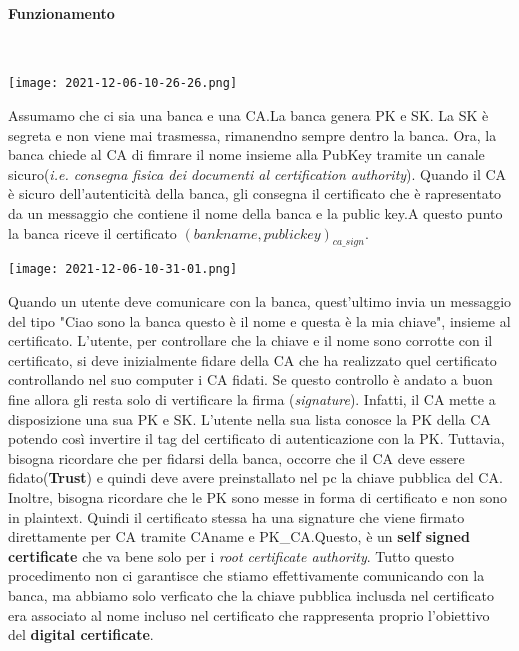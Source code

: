 \documentclass{article}
\theoremstyle{remark}
\begin{document}
\paragraph{Funzionamento}\mbox{}\\
\begin{center}
	\texttt{[image: 2021-12-06-10-26-26.png]}
\end{center}
Assumamo che ci sia una banca e una CA.La banca genera PK e SK. La SK è segreta e non viene mai trasmessa, rimanendno sempre dentro la banca. Ora, la banca chiede al CA di fimrare il nome insieme alla PubKey tramite un canale sicuro(\emph{i.e. consegna fisica dei documenti al certification authority}). Quando il CA è sicuro dell'autenticità della banca, gli consegna il certificato che è rapresentato da un messaggio che contiene il nome della banca e la public key.\newline A questo punto la banca riceve il certificato \emph{\((bankname,publickey)_{ca\_sign}\)}.
\begin{center}
	\texttt{[image: 2021-12-06-10-31-01.png]}
\end{center}
Quando un utente deve comunicare con la banca, quest'ultimo invia un messaggio del tipo "Ciao sono la banca questo è il nome e questa è la mia chiave", insieme al certificato. L'utente, per controllare che la chiave e il nome sono corrotte con il certificato, si deve inizialmente fidare della CA che ha realizzato quel certificato controllando nel suo computer i CA fidati. Se questo controllo è andato a buon fine allora gli resta solo di vertificare la firma (\emph{signature}). Infatti, il CA mette a disposizione una sua PK e SK. L'utente nella sua lista conosce la PK della CA potendo così invertire il tag del certificato di autenticazione con la PK. \newline
Tuttavia, bisogna ricordare che per fidarsi della banca, occorre che il CA deve essere fidato(\textbf{Trust}) e quindi deve avere preinstallato nel pc la chiave pubblica del CA. Inoltre, bisogna ricordare che le PK sono messe in forma di certificato e non sono in plaintext. Quindi il certificato stessa ha una signature che viene firmato direttamente per CA tramite CAname e PK\_CA.Questo, è un \textbf{self signed certificate} che va bene solo per i \emph{root certificate authority}.\newline
Tutto questo procedimento non ci garantisce che stiamo effettivamente comunicando con la banca, ma abbiamo solo verficato che la chiave pubblica inclusda nel certificato era associato al nome incluso nel certificato che rappresenta proprio l'obiettivo del \textbf{digital certificate}. \newline
\end{document}
